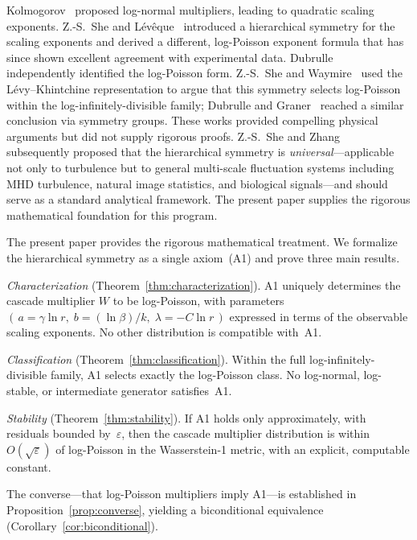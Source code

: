 \documentclass[12pt]{amsart}
\theoremstyle{definition}
\theoremstyle{remark}
\begin{document}
Kolmogorov~\cite{K62} proposed log-normal multipliers, leading to
quadratic scaling exponents.  Z.-S.~She and
L\'ev\^eque~\cite{SL94} introduced a hierarchical symmetry for the
scaling exponents and derived a different, log-Poisson exponent
formula that has since shown excellent agreement with experimental
data.  Dubrulle~\cite{Dub94} independently identified the log-Poisson
form.  Z.-S.~She and Waymire~\cite{SW95} used the
L\'evy--Khintchine representation to argue that this symmetry selects
log-Poisson within the log-infinitely-divisible family; Dubrulle and
Graner~\cite{DG96} reached a similar conclusion via symmetry groups.
These works provided compelling physical arguments but did not supply
rigorous proofs.  Z.-S.~She and Zhang~\cite{SZ09} subsequently
proposed that the hierarchical symmetry is \emph{universal}---applicable
not only to turbulence but to general multi-scale fluctuation systems
including MHD turbulence, natural image statistics, and biological
signals---and should serve as a standard analytical framework.  The
present paper supplies the rigorous mathematical foundation for this
program.

The present paper provides the rigorous mathematical treatment.  We
formalize the hierarchical symmetry as a single axiom~(A1) and prove
three main results.

\emph{Characterization}
(Theorem~\ref{thm:characterization}).  A1 uniquely determines the
cascade multiplier $W$ to be log-Poisson, with parameters
$(\,a = \gamma\ln r,\; b = (\ln\beta)/k,\; \lambda = -C\ln r\,)$
expressed in terms of the observable scaling exponents.  No other
distribution is compatible with~A1.

\emph{Classification}
(Theorem~\ref{thm:classification}).  Within the full
log-infinitely-divisible family, A1 selects exactly the log-Poisson
class.  No log-normal, log-stable, or intermediate generator
satisfies~A1.

\emph{Stability}
(Theorem~\ref{thm:stability}).  If A1 holds only approximately, with
residuals bounded by~$\varepsilon$, then the cascade multiplier
distribution is within $O(\sqrt{\varepsilon})$ of log-Poisson in the
Wasserstein-1 metric, with an explicit, computable constant.

The converse---that log-Poisson multipliers imply
A1---is established in Proposition~\ref{prop:converse}, yielding a
biconditional equivalence (Corollary~\ref{cor:biconditional}).
\end{document}
